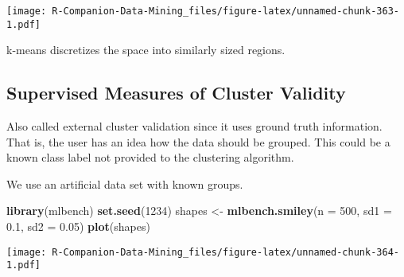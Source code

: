 \documentclass[
  notitlepage]{book}
\newenvironment{Shaded}{\begin{snugshade}}{\end{snugshade}}
\newcommand{\DataTypeTok}[1]{\textcolor[rgb]{0.13,0.29,0.53}{#1}}
\newcommand{\DecValTok}[1]{\textcolor[rgb]{0.00,0.00,0.81}{#1}}
\newcommand{\ErrorTok}[1]{\textcolor[rgb]{0.64,0.00,0.00}{\textbf{#1}}}
\newcommand{\FloatTok}[1]{\textcolor[rgb]{0.00,0.00,0.81}{#1}}
\newcommand{\KeywordTok}[1]{\textcolor[rgb]{0.13,0.29,0.53}{\textbf{#1}}}
\newcommand{\NormalTok}[1]{#1}
\newcommand{\OperatorTok}[1]{\textcolor[rgb]{0.81,0.36,0.00}{\textbf{#1}}}
\newcommand{\StringTok}[1]{\textcolor[rgb]{0.31,0.60,0.02}{#1}}
\begin{document}
\begin{Shaded}
\end{Shaded}

\texttt{[image: R-Companion-Data-Mining\_files/figure-latex/unnamed-chunk-363-1.pdf]}

k-means discretizes the space into similarly sized regions.

\hypertarget{supervised-measures-of-cluster-validity}{%
\subsection{Supervised Measures of Cluster Validity}\label{supervised-measures-of-cluster-validity}}

Also called external cluster validation since it uses ground truth information.
That is, the
user has an idea how the data should be grouped. This could be a known
class label not provided to the clustering algorithm.

We use an artificial data set with known groups.

\begin{Shaded}
\begin{Highlighting}[]
\KeywordTok{library}\NormalTok{(mlbench)}
\KeywordTok{set.seed}\NormalTok{(}\DecValTok{1234}\NormalTok{)}
\NormalTok{shapes \textless{}{-}}\StringTok{ }\KeywordTok{mlbench.smiley}\NormalTok{(}\DataTypeTok{n =} \DecValTok{500}\NormalTok{, }\DataTypeTok{sd1 =} \FloatTok{0.1}\NormalTok{, }\DataTypeTok{sd2 =} \FloatTok{0.05}\NormalTok{)}
\KeywordTok{plot}\NormalTok{(shapes)}
\end{Highlighting}
\end{Shaded}

\texttt{[image: R-Companion-Data-Mining\_files/figure-latex/unnamed-chunk-364-1.pdf]}
\end{document}

